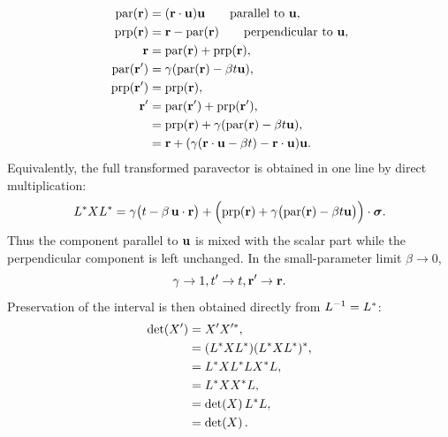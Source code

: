 \begin{align*}
\eqfunc{par}(\vct{r}) &= (\vct{r} \cdot \vct{u}) \vct{u}\qquad \text{parallel to } \vct{u},\notag \\
\eqfunc{prp}(\vct{r}) &= \vct{r} - \eqfunc{par}(\vct{r})\qquad \text{perpendicular to } \vct{u},\notag \\
\vct{r} &= \eqfunc{par}( \vct{r} ) + \eqfunc{prp}( \vct{r} ),\notag \\
\eqfunc{par}( \vct{r}' ) &= \gamma ( \eqfunc{par}( \vct{r} ) - \beta t \vct{u}),\notag \\
\eqfunc{prp}( \vct{r}' ) &= \eqfunc{prp}( \vct{r} ),\notag \\
\vct{r}' &= \eqfunc{par}( \vct{r}' ) + \eqfunc{prp}( \vct{r} ' ),\notag \\
&= \eqfunc{prp}( \vct{r} ) + \gamma ( \eqfunc{par}( \vct{r} ) - \beta t \vct{u}),\notag \\
&= \vct{r} +( \gamma ( \vct{r} \cdot \vct{u} - \beta t ) - \vct{r} \cdot \vct{u} ) \vct{u}.
\end{align*}
Equivalently, the full transformed paravector is obtained in one line by direct multiplication:
\begin{equation*}
L^*XL^*
=\gamma\bigl(t-\beta\,\mathbf{u}\cdot\mathbf{r}\bigr)
+\Bigl(\operatorname{prp}(\mathbf{r})
+\gamma\bigl(\operatorname{par}(\mathbf{r})-\beta t\mathbf{u}\bigr)\Bigr)\cdot\mathbf{\bm{\sigma}}.
\end{equation*}
Thus the component parallel to \(\mathbf{u}\) is mixed with the scalar part while the perpendicular component is left unchanged.
In the small-parameter limit \(\beta\to 0\),
\begin{equation*}
\gamma \to 1, t' \to t, \mathbf{r}' \to \mathbf{r}.
\end{equation*}
Preservation of the interval is then obtained directly from
\(L^{-1}=L^{*}\):
\begin{align*}
\operatorname{det}\!\left(X'\right) &= X'X'^{*},\notag \\
&= (L^{*} X L^{*}) (L^{*} X L^{*})^{*},\notag \\
&= L^{*} X L^{*} L X^{*} L,\notag \\
&= L^{*} X X^{*} L,\notag \\
&= \operatorname{det}\!\left(X\right) L^{*} L,\notag \\
&= \operatorname{det}\!\left(X\right).
\end{align*}

